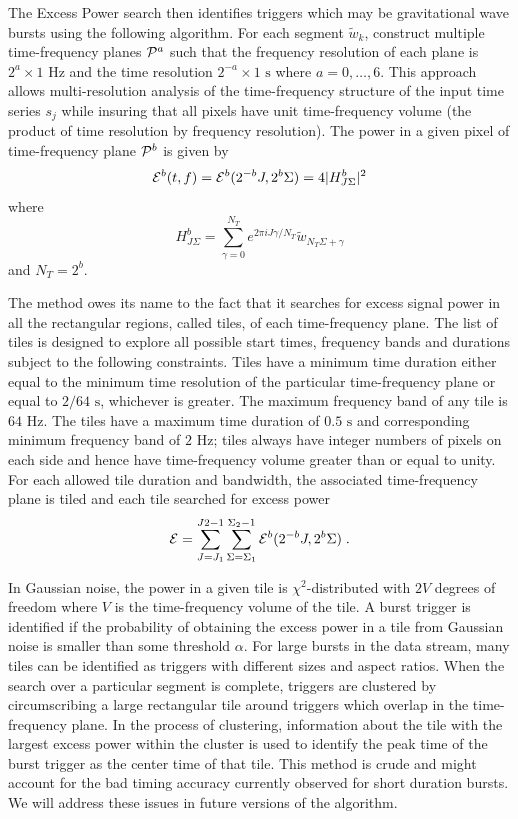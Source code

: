 The Excess Power search then identifies triggers which may be
gravitational wave bursts using the following algorithm.  For each
segment $\tilde{w}_k$,  construct multiple time-frequency planes
${\cal{P}}^a$ such that the frequency resolution of each plane is
$2^a \times 1 \textrm{ Hz}$ and the time resolution $2^{-a} \times 1
\textrm{ s}$ where $a=0,\ldots ,6$.  This approach allows
multi-resolution analysis of the time-frequency structure of the input
time series $s_j$ while insuring that all pixels have unit
time-frequency volume (the product of time resolution by frequency
resolution).   The power in a given pixel of time-frequency plane
${\cal{P}}^b$ is given by
\begin{equation}
{\cal E}^b(t,f) = {\cal E}^b( 2^{-b} J, 2^b \Sigma ) = 4 | H^b_{J\Sigma} |^2
\end{equation}
where 
\begin{equation}
H^b_{J\Sigma} = \sum_{\gamma=0}^{N_T} e^{ 2 \pi i J \gamma / N_T }
\tilde{w}_{N_T \Sigma + \gamma}
\end{equation}
and $N_T = 2^b$.

The method owes its name to the fact that it searches for excess
signal power in all the rectangular regions, called tiles, of each
time-frequency plane.  The list of tiles is designed to explore all
possible start times, frequency bands and durations subject to the
following constraints.  Tiles have a minimum time duration either
equal to the minimum time resolution of the particular time-frequency
plane or equal to $2/64 \textrm{ s}$,  whichever is greater.  The
maximum frequency band of any tile is $64 \textrm{ Hz}$.  The tiles
have a maximum time duration of $0.5 \textrm{ s}$ and corresponding
minimum frequency band of $2 \textrm{ Hz}$;  tiles always have integer
numbers of pixels on each side and hence have time-frequency volume
greater than or equal to unity.  For each allowed tile duration and
bandwidth,  the associated time-frequency plane is tiled and each tile
searched for excess power
\begin{equation}
{\cal{E}} = \sum_{J=J_1}^{J2-1} \sum_{\Sigma=\Sigma_1}^{\Sigma_2-1}
{\cal E}^b( 2^{-b} J , 2^b \Sigma ) \;.
\end{equation}

In Gaussian noise,  the power in a given tile is $\chi^2$-distributed
with $2 V$ degrees of freedom where $V$ is the time-frequency volume
of the tile.    A burst trigger is identified if the probability of
obtaining the excess power in a tile from Gaussian noise is smaller
than some threshold $\alpha$.   For large bursts in the data stream,
many tiles can be identified as triggers with different sizes and
aspect ratios.   When the search over a particular segment is
complete,   triggers are clustered by circumscribing a large
rectangular tile around triggers which overlap in the time-frequency
plane.    In the process of clustering,  information about the tile
with the largest excess power within the cluster is used to identify
the peak time of the burst trigger as the center time of that tile.
This method is crude and might account for the bad timing accuracy
currently observed for short duration bursts.  We will address these
issues in future versions of the algorithm.

